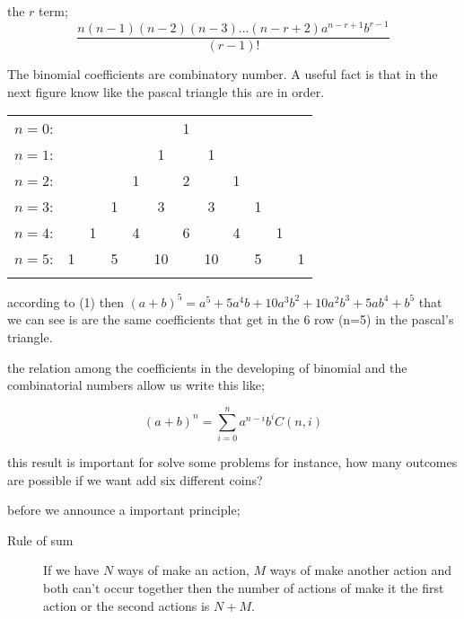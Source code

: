 \documentclass[10pt,a4paper]{article}
\begin{document}
the $r$ term;
\begin{equation}
\dfrac{n(n-1)(n-2)(n-3)...(n-r+2)a^{n-r+1}b^{r-1}}{(r-1)!}
\end{equation}


 The binomial coefficients are combinatory number.  A useful fact is that  in the next figure know like the pascal triangle this are in order. 


\begin{center}

\begin{tabular}{rccccccccccc}
$n=0$:&    &    &    &    &  & 1\\\noalign{\smallskip\smallskip}
$n=1$:&    &    &    &   &   1  &  & 1\\\noalign{\smallskip\smallskip}
$n=2$:&    &    &   & 1   &   & 2   &  & 1\\\noalign{\smallskip\smallskip}
$n=3$:&    &   &  1  &   & 3   &   &  3  &  &1\\\noalign{\smallskip\smallskip}
$n=4$:&   &  1  &   & 4   &   & 6   &   & 4   & &   1 \\\noalign{\smallskip\smallskip}
$n=5$:&  1 &    &  5 &    & 10 &    &  10 &    &  5 & & 1\\ \noalign{\smallskip\smallskip}

\end{tabular}

\end{center}

according to (1) then $(a+b)^5 = a^{5} + 5 a^4 b + 10a^{3}b^{2}+ 10a^{2}b^{3}+5ab^{4}+ b^{5}$ that we can see is are the same coefficients that get in the 6 row (n=5) in the pascal's triangle.

the relation among the coefficients in the developing of binomial and the combinatorial numbers allow us write this like;


\begin{equation}
\label{binomio}
(a+b)^{n} = \sum_{i=0}^{n} a^{n-i}b^{i}C(n,i) 
\end{equation}




this result is important for solve some problems for instance, how many outcomes are possible if we want add   six different coins?

before we announce a important principle; 

\begin{description}
\item[Rule of sum]

If we have $N$ ways of make an action, $M$ ways of make another action and both can't occur together then the number of actions of make it the first action or the second actions is $N+M$.
\end{description}
\end{document}
